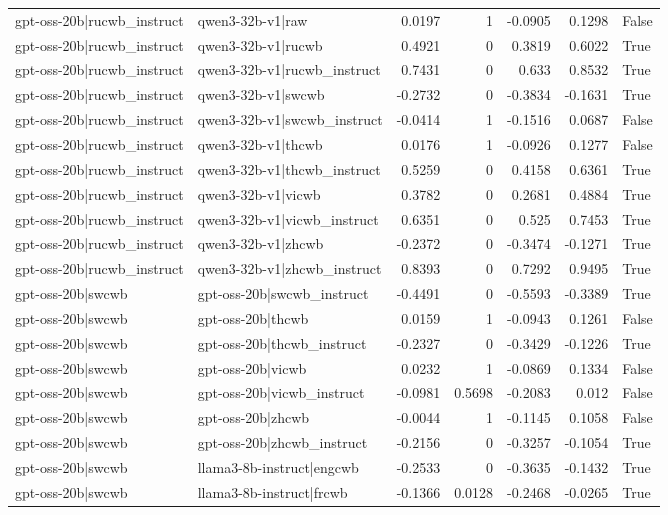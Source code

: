 \begin{table}
\begin{tabular}{l l r r r r l}
gpt-oss-20b|rucwb_instruct & qwen3-32b-v1|raw & 0.0197 & 1 & -0.0905 & 0.1298 & False \\
gpt-oss-20b|rucwb_instruct & qwen3-32b-v1|rucwb & 0.4921 & 0 & 0.3819 & 0.6022 & True \\
gpt-oss-20b|rucwb_instruct & qwen3-32b-v1|rucwb_instruct & 0.7431 & 0 & 0.633 & 0.8532 & True \\
gpt-oss-20b|rucwb_instruct & qwen3-32b-v1|swcwb & -0.2732 & 0 & -0.3834 & -0.1631 & True \\
gpt-oss-20b|rucwb_instruct & qwen3-32b-v1|swcwb_instruct & -0.0414 & 1 & -0.1516 & 0.0687 & False \\
gpt-oss-20b|rucwb_instruct & qwen3-32b-v1|thcwb & 0.0176 & 1 & -0.0926 & 0.1277 & False \\
gpt-oss-20b|rucwb_instruct & qwen3-32b-v1|thcwb_instruct & 0.5259 & 0 & 0.4158 & 0.6361 & True \\
gpt-oss-20b|rucwb_instruct & qwen3-32b-v1|vicwb & 0.3782 & 0 & 0.2681 & 0.4884 & True \\
gpt-oss-20b|rucwb_instruct & qwen3-32b-v1|vicwb_instruct & 0.6351 & 0 & 0.525 & 0.7453 & True \\
gpt-oss-20b|rucwb_instruct & qwen3-32b-v1|zhcwb & -0.2372 & 0 & -0.3474 & -0.1271 & True \\
gpt-oss-20b|rucwb_instruct & qwen3-32b-v1|zhcwb_instruct & 0.8393 & 0 & 0.7292 & 0.9495 & True \\
gpt-oss-20b|swcwb & gpt-oss-20b|swcwb_instruct & -0.4491 & 0 & -0.5593 & -0.3389 & True \\
gpt-oss-20b|swcwb & gpt-oss-20b|thcwb & 0.0159 & 1 & -0.0943 & 0.1261 & False \\
gpt-oss-20b|swcwb & gpt-oss-20b|thcwb_instruct & -0.2327 & 0 & -0.3429 & -0.1226 & True \\
gpt-oss-20b|swcwb & gpt-oss-20b|vicwb & 0.0232 & 1 & -0.0869 & 0.1334 & False \\
gpt-oss-20b|swcwb & gpt-oss-20b|vicwb_instruct & -0.0981 & 0.5698 & -0.2083 & 0.012 & False \\
gpt-oss-20b|swcwb & gpt-oss-20b|zhcwb & -0.0044 & 1 & -0.1145 & 0.1058 & False \\
gpt-oss-20b|swcwb & gpt-oss-20b|zhcwb_instruct & -0.2156 & 0 & -0.3257 & -0.1054 & True \\
gpt-oss-20b|swcwb & llama3-8b-instruct|engcwb & -0.2533 & 0 & -0.3635 & -0.1432 & True \\
gpt-oss-20b|swcwb & llama3-8b-instruct|frcwb & -0.1366 & 0.0128 & -0.2468 & -0.0265 & True \\

\end{tabular}
\end{table}
